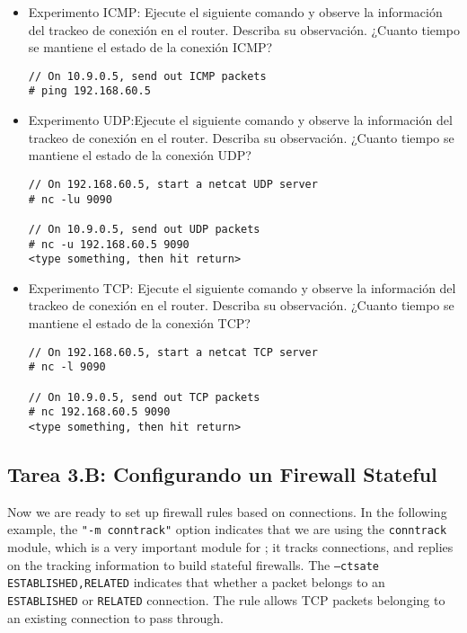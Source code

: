 \begin{itemize}
\item Experimento ICMP: Ejecute el siguiente comando y observe la información del trackeo de conexión en el router. Describa su observación. ¿Cuanto tiempo se mantiene el estado de la conexión ICMP?

\begin{lstlisting}
// On 10.9.0.5, send out ICMP packets
# ping 192.168.60.5
\end{lstlisting}

\item Experimento UDP:Ejecute el siguiente comando y observe la información del trackeo de conexión en el router. Describa su observación. ¿Cuanto tiempo se mantiene el estado de la conexión UDP?


\begin{lstlisting}
// On 192.168.60.5, start a netcat UDP server
# nc -lu 9090

// On 10.9.0.5, send out UDP packets  
# nc -u 192.168.60.5 9090
<type something, then hit return>
\end{lstlisting}


\item Experimento TCP: Ejecute el siguiente comando y observe la información del trackeo de conexión en el router. Describa su observación. ¿Cuanto tiempo se mantiene el estado de la conexión TCP?

\begin{lstlisting}
// On 192.168.60.5, start a netcat TCP server
# nc -l 9090

// On 10.9.0.5, send out TCP packets 
# nc 192.168.60.5 9090
<type something, then hit return>
\end{lstlisting}

\end{itemize}
 


\subsection{Tarea 3.B: Configurando un Firewall Stateful} 


Now we are ready to set up firewall rules based on connections. 
In the following example, 
the \texttt{"-m conntrack"} option indicates that we are using the \texttt{conntrack} module,
which is a very important module for \iptables; it tracks connections, and
\iptables replies on the tracking information to build stateful firewalls. 
The \texttt{--ctsate ESTABLISHED,RELATED} indicates that whether a packet
belongs to an \texttt{ESTABLISHED} or \texttt{RELATED} connection.
The rule allows TCP packets belonging to an existing connection to 
pass through. 

